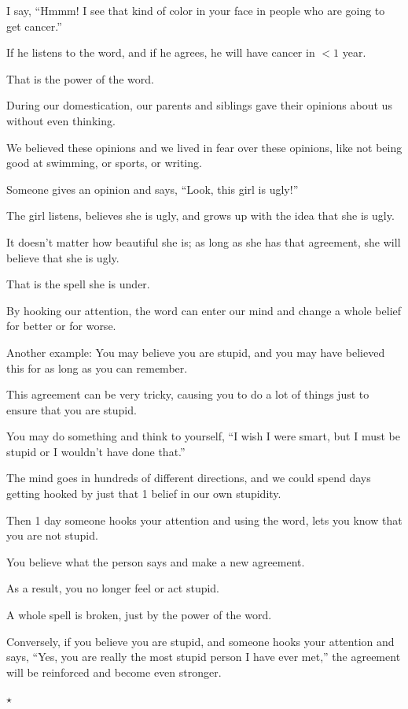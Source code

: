 \documentclass{article}
\numberwithin{equation}{section}
\begin{document}
I say, ``Hmmm! I see that kind of color in your face in people who are going to get cancer.''

If he listens to the word, and if he agrees, he will have cancer in $< 1$ year.

That is the power of the word.

%
During our domestication, our parents and siblings gave their opinions about us without even thinking.

We believed these opinions and we lived in fear over these opinions, like not being good at swimming, or sports, or writing.

Someone gives an opinion and says, ``Look, this girl is ugly!''

The girl listens, believes she is ugly, and grows up with the idea that she is ugly.

It doesn't matter how beautiful she is; as long as she has that agreement, she will believe that she is ugly.

That is the spell she is under.

%
By hooking our attention, the word can enter our mind and change a whole belief for better or for worse.

Another example: You may believe you are stupid, and you may have believed this for as long as you can remember.

This agreement can be very tricky, causing you to do a lot of things just to ensure that you are stupid.

You may do something and think to yourself, ``I wish I were smart, but I must be stupid or I wouldn't have done that.''

The mind goes in hundreds of different directions, and we could spend days getting hooked by just that 1 belief in our own stupidity.

%
Then 1 day someone hooks your attention and using the word, lets you know that you are not stupid.

You believe what the person says and make a new agreement.

As a result, you no longer feel or act stupid.

A whole spell is broken, just by the power of the word.

Conversely, if you believe you are stupid, and someone hooks your attention and says, ``Yes, you are really the most stupid person I have ever met,'' the agreement will be reinforced and become even stronger.
\begin{center}
    $\star$
\end{center}
\end{document}
